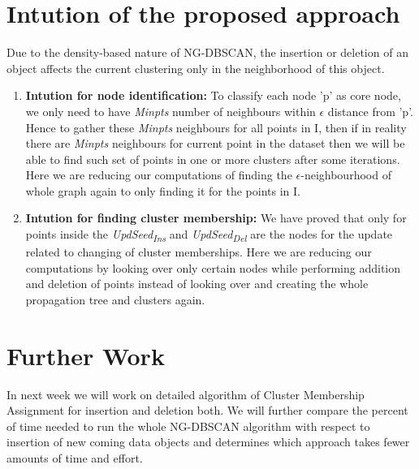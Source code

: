 \documentclass[acmsmall]{acmart}
\begin{document}
\section*{Intution of the proposed approach}
Due to the density-based nature of NG-DBSCAN, the insertion or deletion of an object affects the current clustering only in the neighborhood of this object.
\begin{enumerate}
    \item \textbf{Intution for node identification: }To classify each node 'p' as core node, we only need to have \textit{Minpts} number of neighbours within $\epsilon$ distance from 'p'. Hence to gather these \textit{Minpts} neighbours for all points in I, then if in reality there are \textit{Minpts} neighbours for current point in the dataset then we will be able to find such set of points in one or more clusters after some iterations. \newline
    Here we are reducing our computations of finding the $\epsilon$-neighbourhood of whole graph again to only finding it for the points in I. 
    \item \textbf{Intution for finding cluster membership: }We have proved that only for points inside the \textit{UpdSeed\textsubscript{Ins}} and \textit{UpdSeed\textsubscript{Del}} are the nodes for the update related to changing of cluster memberships. \newline 
    Here we are reducing our computations by looking over only certain nodes while performing addition and deletion of points instead of looking over and creating the whole propagation tree and clusters again. 
\end{enumerate}

\section*{Further Work}
In next week we will work on detailed algorithm of Cluster Membership Assignment for insertion and deletion both. We will further compare the percent of time needed to run the whole NG-DBSCAN algorithm with respect to insertion of new coming data objects and determines which approach takes fewer amounts of time and effort.
\end{document}
